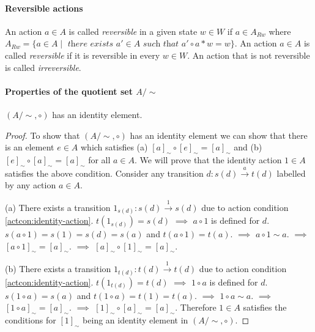\paragraph{Reversible actions}
An action $a \in A$ is called \textit{reversible} in a given state $w \in W$ if $a \in A_{R w}$ where $A_{Rw} = \{a \in A \mid\textit{ there exists }a' \in A\textit{ such that }a' \circ a * w = w \}$.
An action $a \in A$ is called \textit{reversible} if it is reversible in every $w \in W$.
An action that is not reversible is called \textit{irreversible}.

\paragraph{Properties of the quotient set $A/\sim$}

\begin{proposition}\label{prp:Asim-identity}
    $(A/\sim, \circ)$ has an identity element.
\end{proposition}
\begin{proof}
    To show that $(A/\sim, \circ)$ has an identity element we can show that there is an element $e \in A$ which satisfies (a) $[a]_{\sim} \circ [e]_{\sim} = [a]_{\sim}$ and (b) $[e]_{\sim} \circ [a]_{\sim} = [a]_{\sim}$ for all $a \in A$.
    We will prove that the identity action $1 \in A$ satisfies the above condition.
    Consider any transition $d: s(d) \xrightarrow{a} t(d)$ labelled by any action $a \in A$.
    
    (a) There exists a transition $1_{s(d)}: s(d) \xrightarrow{1} s(d)$ due to action condition \ref{actcon:identity-action}.
    $t(1_{s(d)})=s(d)$ $\implies$ $a \circ 1$ is defined for $d$.
    $s(a \circ 1) = s(1) = s(d) = s(a)$ and $t(a \circ 1) = t(a)$.
    $\implies$ $a \circ 1 \sim a$.
    $\implies$ $[a \circ 1]_{\sim} = [a]_{\sim}$.
    $\implies$ $[a]_{\sim} \circ [1]_{\sim} = [a]_{\sim}$.
    
    (b) There exists a transition $1_{t(d)}: t(d) \xrightarrow{1} t(d)$ due to action condition \ref{actcon:identity-action}.
    $t(1_{t(d)})=t(d)$ $\implies$ $1 \circ a$ is defined for $d$.
    $s(1 \circ a)=s(a)$ and $t(1 \circ a) = t(1) = t(a)$.
    $\implies$ $1 \circ a \sim a$.
    $\implies$ $[1 \circ a]_{\sim} = [a]_{\sim}$.
    $\implies$ $[1]_{\sim} \circ [a]_{\sim} = [a]_{\sim}$.
    Therefore $1 \in A$ satisfies the conditions for $[1]_{\sim}$ being an identity element in $(A/\sim, \circ)$.
\end{proof}

